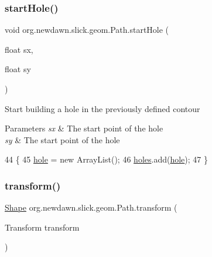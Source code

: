 \subsubsection{\texorpdfstring{start\+Hole()}{startHole()}}
{\footnotesize\ttfamily void org.\+newdawn.\+slick.\+geom.\+Path.\+start\+Hole (\begin{DoxyParamCaption}\item[{float}]{sx,  }\item[{float}]{sy }\end{DoxyParamCaption})\hspace{0.3cm}{\ttfamily [inline]}}

Start building a hole in the previously defined contour


\begin{DoxyParams}{Parameters}
{\em sx} & The start point of the hole \\
\hline
{\em sy} & The start point of the hole \\
\hline
\end{DoxyParams}

\begin{DoxyCode}
44                                               \{
45         \mbox{\hyperlink{classorg_1_1newdawn_1_1slick_1_1geom_1_1_path_a55b64931dd61b899d51a58c1e969e728}{hole}} = \textcolor{keyword}{new} ArrayList();
46         \mbox{\hyperlink{classorg_1_1newdawn_1_1slick_1_1geom_1_1_path_aaed98e69613a609d6461530dc8c2f20b}{holes}}.add(\mbox{\hyperlink{classorg_1_1newdawn_1_1slick_1_1geom_1_1_path_a55b64931dd61b899d51a58c1e969e728}{hole}});
47     \}
\end{DoxyCode}
\mbox{\label{classorg_1_1newdawn_1_1slick_1_1geom_1_1_path_a17055610942f82343760c043ace084df}} 
\subsubsection{\texorpdfstring{transform()}{transform()}\hspace{0.1cm}{\footnotesize\ttfamily [1/2]}}
{\footnotesize\ttfamily \mbox{\hyperlink{classorg_1_1newdawn_1_1slick_1_1geom_1_1_shape}{Shape}} org.\+newdawn.\+slick.\+geom.\+Path.\+transform (\begin{DoxyParamCaption}\item[{Transform}]{transform }\end{DoxyParamCaption})\hspace{0.3cm}{\ttfamily [inline]}}

